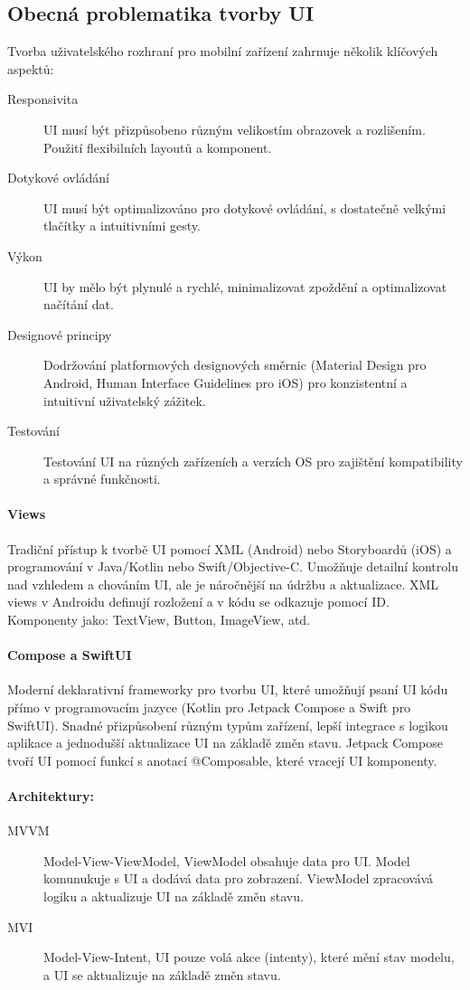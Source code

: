 \subsection{Obecná problematika tvorby UI}
Tvorba uživatelského rozhraní pro mobilní zařízení zahrnuje několik klíčových aspektů:
\begin{description}
    \item[Responsivita] UI musí být přizpůsobeno různým velikostím obrazovek a 
    rozlišením. Použití flexibilních layoutů a komponent.
    \item[Dotykové ovládání] UI musí být optimalizováno pro dotykové ovládání, s 
    dostatečně velkými tlačítky a intuitivními gesty.
    \item[Výkon] UI by mělo být plynulé a rychlé, minimalizovat zpoždění a 
    optimalizovat načítání dat.
    \item[Designové principy] Dodržování platformových designových směrnic 
    (Material Design pro Android, Human Interface Guidelines pro iOS) pro konzistentní 
    a intuitivní uživatelský zážitek.
    \item[Testování] Testování UI na různých zařízeních a verzích OS pro zajištění 
    kompatibility a správné funkčnosti.
\end{description}

\paragraph*{Views}
Tradiční přístup k tvorbě UI pomocí XML (Android) nebo Storyboardů (iOS) a 
programování v Java/Kotlin nebo Swift/Objective-C. Umožňuje detailní kontrolu nad 
vzhledem a chováním UI, ale je náročnější na údržbu a aktualizace.
XML views v Androidu definují rozložení a v kódu se odkazuje pomocí ID. Komponenty
jako: TextView, Button, ImageView, atd.

\paragraph*{Compose a SwiftUI}
Moderní deklarativní frameworky pro tvorbu UI, které umožňují psaní UI kódu přímo v 
programovacím jazyce (Kotlin pro Jetpack Compose a Swift pro SwiftUI). Snadné 
přizpůsobení různým typům zařízení, lepší integrace s logikou aplikace a jednodušší 
aktualizace UI na základě změn stavu.
Jetpack Compose tvoří UI pomocí funkcí s anotací @Composable, které vracejí UI 
komponenty. 
\paragraph*{Architektury:} 
\begin{description}
    \item[MVVM] Model-View-ViewModel, ViewModel obsahuje data pro UI. Model komunukuje s UI a dodává data pro zobrazení. 
    ViewModel zpracovává logiku a aktualizuje UI na základě změn stavu.
    \item[MVI] Model-View-Intent, UI pouze volá akce (intenty), které mění stav modelu, a UI se aktualizuje na základě změn stavu.
\end{description}

